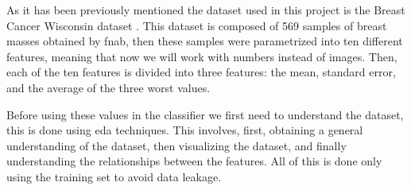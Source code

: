 As it has been previously mentioned the dataset used in this project is the Breast Cancer Wisconsin dataset \cite{william_wolberg_breast_1993}. This dataset is composed of 569 samples of breast masses obtained by \ac{fnab}, then these samples were parametrized into ten different features, meaning that now we will work with numbers instead of images. Then, each of the ten features is divided into three features: the mean, standard error, and the average of the three worst values.


Before using these values in the classifier we first need to understand the dataset, this is done using \ac{eda} techniques. This involves, first, obtaining a general understanding of the dataset, then visualizing the dataset, and finally understanding the relationships between the features. All of this is done only using the training set to avoid data leakage.

